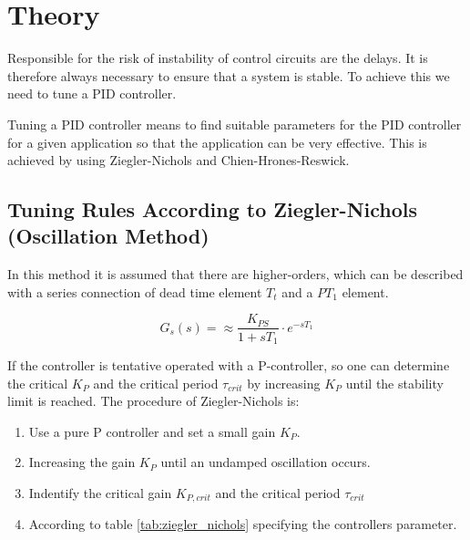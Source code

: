 \section{Theory}

Responsible for the risk of instability of control circuits are the delays. It
is therefore always necessary to ensure that a  system  is  stable. To achieve
this we need to tune a PID controller.

Tuning  a PID controller  means  to  find  suitable  parameters  for  the  PID
controller  for  a  given  application  so  that the application can  be  very
effective. This is achieved by using Ziegler-Nichols and Chien-Hrones-Reswick.


\subsection{Tuning Rules According to Ziegler-Nichols (Oscillation Method)}

In this method it  is  assumed  that  there  are  higher-orders,  which can be
described with a series connection of dead time element $T_{t}$ and a $PT_{1}$
element.

\begin{equation}
    G_{s}(s) =  \approx \frac{K_{PS}}{1+sT_{1}} \cdot e^{-sT_{1}}
\end{equation}

If the controller  is  tentative  operated  with  a  P-controller,  so one can
determine  the  critical  $K_{P}$  and  the  critical period $\tau_{crit}$  by
increasing $K_{P}$ until the stability limit is reached.
The procedure of Ziegler-Nichols is:

\begin{enumerate}
    \item Use a pure P controller and set a small gain $K_{P}$.
    \item Increasing the gain $K_{P}$ until an undamped oscillation occurs.
    \item Indentify the critical gain $K_{P,crit}$ and the critical period $\tau_{crit}$
    \item According to table \ref{tab:ziegler_nichols} specifying the controllers parameter.
\end{enumerate}

